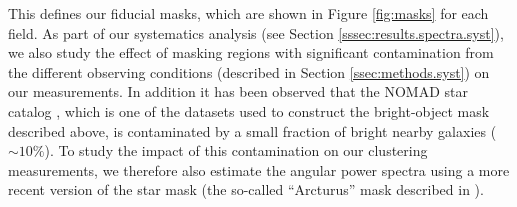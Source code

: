 \documentclass[a4paper,11pt]{article}
\begin{document}
    This defines our fiducial masks, which are shown in Figure \ref{fig:masks} for each field. As part of our systematics analysis (see Section \ref{sssec:results.spectra.syst}), we also study the effect of masking regions with significant contamination from the different observing conditions (described in Section \ref{ssec:methods.syst}) on our measurements. In addition it has been observed that the NOMAD star catalog \cite{2004AAS...205.4815Z}, which is one of the datasets used to construct the bright-object mask described above, is contaminated by a small fraction of bright nearby galaxies ($\sim10\%$). To study the impact of this contamination on our clustering measurements, we therefore also estimate the angular power spectra using a more recent version of the star mask (the so-called ``Arcturus'' mask described in \cite{2018PASJ...70S...7C}).
\end{document}
